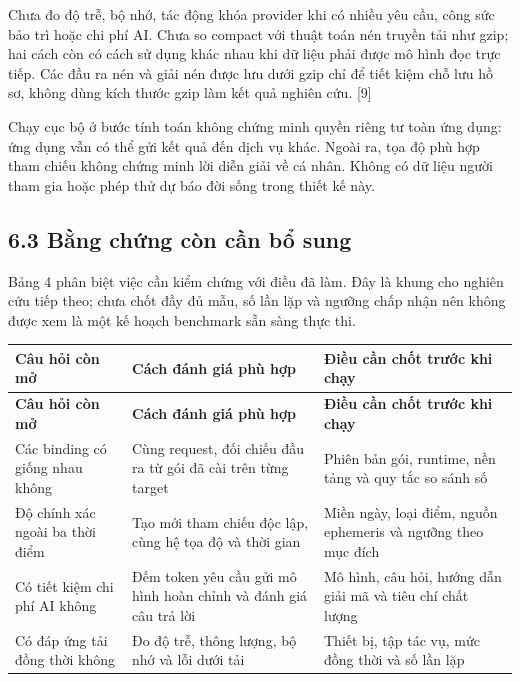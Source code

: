 \documentclass[11pt,a4paper]{article}
\begin{document}
Chưa đo độ trễ, bộ nhớ, tác động khóa provider khi có nhiều yêu cầu, công sức bảo trì hoặc chi phí AI. Chưa so compact với thuật toán nén truyền tải như gzip; hai cách còn có cách sử dụng khác nhau khi dữ liệu phải được mô hình đọc trực tiếp. Các đầu ra nén và giải nén được lưu dưới gzip chỉ để tiết kiệm chỗ lưu hồ sơ, không dùng kích thước gzip làm kết quả nghiên cứu. [9]


Chạy cục bộ ở bước tính toán không chứng minh quyền riêng tư toàn ứng dụng: ứng dụng vẫn có thể gửi kết quả đến dịch vụ khác. Ngoài ra, tọa độ phù hợp tham chiếu không chứng minh lời diễn giải về cá nhân. Không có dữ liệu người tham gia hoặc phép thử dự báo đời sống trong thiết kế này.


\subsection*{6.3 Bằng chứng còn cần bổ sung}
Bảng 4 phân biệt việc cần kiểm chứng với điều đã làm. Đây là khung cho nghiên cứu tiếp theo; chưa chốt đầy đủ mẫu, số lần lặp và ngưỡng chấp nhận nên không được xem là một kế hoạch benchmark sẵn sàng thực thi.


\par\medskip{}\nopagebreak
{\fontsize{10}{12}\selectfont\begin{longtable}{>{\raggedright\arraybackslash}p{}>{\raggedright\arraybackslash}p{}>{\raggedright\arraybackslash}p{}}
\toprule \textbf{Câu hỏi còn mở} & \textbf{Cách đánh giá phù hợp} & \textbf{Điều cần chốt trước khi chạy} \\ \midrule
\endfirsthead\toprule \textbf{Câu hỏi còn mở} & \textbf{Cách đánh giá phù hợp} & \textbf{Điều cần chốt trước khi chạy} \\ \midrule\endhead\bottomrule\endfoot

Các binding có giống nhau không & Cùng request, đối chiếu đầu ra từ gói đã cài trên từng target & Phiên bản gói, runtime, nền tảng và quy tắc so sánh số \\
Độ chính xác ngoài ba thời điểm & Tạo mới tham chiếu độc lập, cùng hệ tọa độ và thời gian & Miền ngày, loại điểm, nguồn ephemeris và ngưỡng theo mục đích \\
Có tiết kiệm chi phí AI không & Đếm token yêu cầu gửi mô hình hoàn chỉnh và đánh giá câu trả lời & Mô hình, câu hỏi, hướng dẫn giải mã và tiêu chí chất lượng \\
Có đáp ứng tải đồng thời không & Đo độ trễ, thông lượng, bộ nhớ và lỗi dưới tải & Thiết bị, tập tác vụ, mức đồng thời và số lần lặp \\
\end{longtable}}
\end{document}
